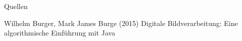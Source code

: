 \documentclass[14pt]{beamer}
\begin{document}
\section*{}

\begin{frame}
	\Large{}	
	\newline
	\begin{block}{Quellen}
		\small{	
		\begin{thebibliography}{99} %
			 Wilhelm Burger, Mark James Burge (2015)
			\newblock Digitale Bildverarbeitung: Eine algorithmische Einführung mit Java
		\end{thebibliography}
		}
	\end{block}
\end{frame}
\end{document}
